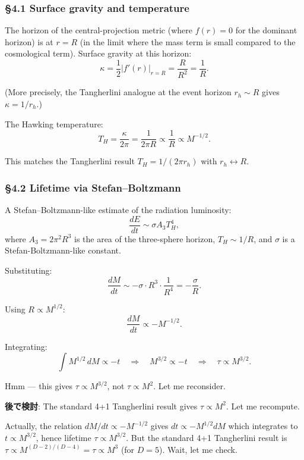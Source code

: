 \documentclass[a4paper,11pt]{article}
\theoremstyle{definition}
\begin{document}
\subsubsection{§4.1 Surface gravity and
temperature}\label{surface-gravity-and-temperature}

The horizon of the central-projection metric (where \(f(r) = 0\) for the
dominant horizon) is at \(r = R\) (in the limit where the mass term is
small compared to the cosmological term). Surface gravity at this
horizon:
\[\kappa = \frac{1}{2} |f'(r)|_{r=R} = \frac{R}{R^2} = \frac{1}{R}.\]

(More precisely, the Tangherlini analogue at the event horizon
\(r_h \sim R\) gives \(\kappa = 1/r_h\).)

The Hawking temperature:
\[T_H = \frac{\kappa}{2\pi} = \frac{1}{2\pi R} \propto \frac{1}{R} \propto M^{-1/2}.\]

This matches the Tangherlini result \(T_H = 1/(2\pi r_h)\) with
\(r_h \leftrightarrow R\).

\subsubsection{§4.2 Lifetime via
Stefan--Boltzmann}\label{lifetime-via-stefanboltzmann}

A Stefan--Boltzmann-like estimate of the radiation luminosity:
\[\frac{dE}{dt} \sim \sigma A_3 T_H^4,\] where \(A_3 = 2\pi^2 R^3\) is
the area of the three-sphere horizon, \(T_H \sim 1/R\), and \(\sigma\)
is a Stefan-Boltzmann-like constant.

Substituting:
\[\frac{dM}{dt} \sim -\sigma \cdot R^3 \cdot \frac{1}{R^4} = -\frac{\sigma}{R}.\]

Using \(R \propto M^{1/2}\): \[\frac{dM}{dt} \propto -M^{-1/2}.\]

Integrating:
\[\int M^{1/2}\, dM \propto -t \quad \Longrightarrow \quad M^{3/2} \propto -t \quad \Longrightarrow \quad \tau \propto M^{3/2}.\]

Hmm --- this gives \(\tau \propto M^{3/2}\), not \(\tau \propto M^2\).
Let me reconsider.

\textbf{後で検討}: The standard 4+1 Tangherlini result gives
\(\tau \propto M^2\). Let me recompute.

Actually, the relation \(dM/dt \propto -M^{-1/2}\) gives
\(dt \propto -M^{1/2} dM\) which integrates to \(t \propto M^{3/2}\),
hence lifetime \(\tau \propto M^{3/2}\). But the standard 4+1
Tangherlini result is
\(\tau \propto M^{(D-2)/(D-4)} = \tau \propto M^{3}\) (for \(D = 5\)).
Wait, let me check.
\end{document}
